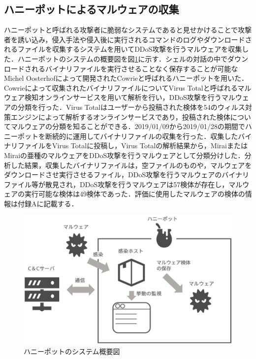 \subsection{ハニーポットによるマルウェアの収集}
ハニーポットと呼ばれる攻撃者に脆弱なシステムであると見せかけることで攻撃者を誘い込み，侵入手法や侵入後に実行されるコマンドのログやダウンロードされるファイルを収集するシステムを用いてDDoS攻撃を行うマルウェアを収集した．ハニーポットのシステムの概要図を図\ref{fig:honey}に示す．シェルの対話の中でダウンロードされるバイナリファイルを実行させることなく保存することが可能なMichel Oosterhofによって開発されたCowrie\cite{Cowrie}と呼ばれるハニーポットを用いた．Cowrieによって収集されたバイナリファイルについてVirus Totalと呼ばれるマルウェア検知オンラインサービスを用いて解析を行い，DDoS攻撃を行うマルウェアの分類を行った．Virus Total\cite{Virus}はユーザーから投稿された検体を54のウィルス対策エンジンによって解析するオンラインサービスであり，投稿された検体についてマルウェアの分類を知ることができる．2019/01/09から2019/01/28の期間でハニーポットを断続的に運用してバイナリファイルの収集を行った．収集したバイナリファイルをVirus Totalに投稿し，Virus Totalの解析結果から，MiraiまたはMiraiの亜種のマルウェアをDDoS攻撃を行うマルウェアとして分類分けした．分析した結果，収集したバイナリファイルは，空ファイルのものや，マルウェアをダウンロードさせ実行させるファイル，DDoS攻撃を行うマルウェアのバイナリファイル等が散見され，DDoS攻撃を行うマルウェアは57検体が存在し，マルウェアの実行可能な検体は49検体であった．評価に使用したマルウェアの検体の情報は付録Aに記載する．
\begin{figure}[h]
    \centering
       \includegraphics[width=120mm]{figures/honey.eps}
    \caption{ハニーポットのシステム概要図}
    \label{fig:honey}
\end{figure}

